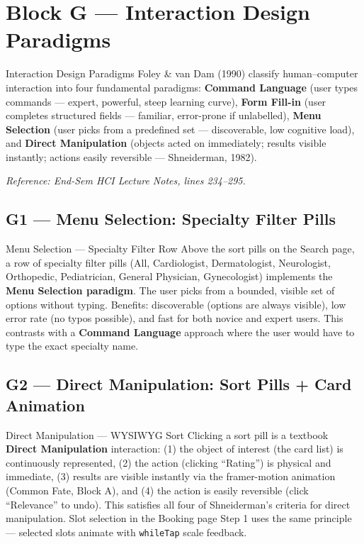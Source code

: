 \documentclass[12pt, a4paper]{article}
\begin{document}
\vspace{0.5cm}

\section{Block G --- Interaction Design Paradigms}

\begin{hcibox}{Interaction Design Paradigms}
Foley \& van Dam (1990) classify human--computer interaction into four fundamental paradigms: \textbf{Command Language} (user types commands --- expert, powerful, steep learning curve), \textbf{Form Fill-in} (user completes structured fields --- familiar, error-prone if unlabelled), \textbf{Menu Selection} (user picks from a predefined set --- discoverable, low cognitive load), and \textbf{Direct Manipulation} (objects acted on immediately; results visible instantly; actions easily reversible --- Shneiderman, 1982).

\textit{Reference: End-Sem HCI Lecture Notes, lines 234--295.}
\end{hcibox}

\subsection{G1 --- Menu Selection: Specialty Filter Pills}

\begin{featurebox}{Menu Selection --- Specialty Filter Row}
Above the sort pills on the Search page, a row of specialty filter pills (All, Cardiologist, Dermatologist, Neurologist, Orthopedic, Pediatrician, General Physician, Gynecologist) implements the \textbf{Menu Selection paradigm}. The user picks from a bounded, visible set of options without typing. Benefits: discoverable (options are always visible), low error rate (no typos possible), and fast for both novice and expert users. This contrasts with a \textbf{Command Language} approach where the user would have to type the exact specialty name.
\end{featurebox}

\subsection{G2 --- Direct Manipulation: Sort Pills + Card Animation}

\begin{featurebox}{Direct Manipulation --- WYSIWYG Sort}
Clicking a sort pill is a textbook \textbf{Direct Manipulation} interaction: (1) the object of interest (the card list) is continuously represented, (2) the action (clicking ``Rating'') is physical and immediate, (3) results are visible instantly via the framer-motion animation (Common Fate, Block A), and (4) the action is easily reversible (click ``Relevance'' to undo). This satisfies all four of Shneiderman's criteria for direct manipulation. Slot selection in the Booking page Step 1 uses the same principle --- selected slots animate with \texttt{whileTap} scale feedback.
\end{featurebox}
\end{document}
